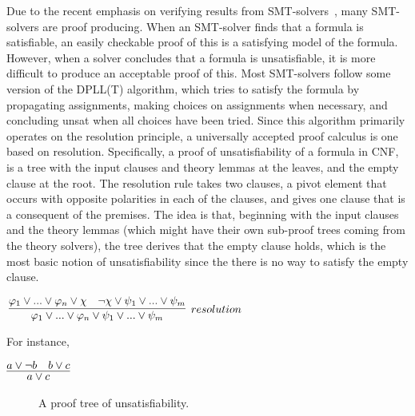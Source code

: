 \documentclass{article}
\begin{document}
	Due to the recent emphasis on verifying results from SMT-solvers~\cite{10.1145/1670412.1670413,
	mansur2020detecting, 10.1007/978-3-642-38916-0_3},
	many SMT-solvers are proof producing. When an SMT-solver finds 
	that a formula is satisfiable, an easily checkable proof of this is 
	a satisfying model of the formula. However, when a solver 
	concludes that a formula is unsatisfiable, it is more difficult 
	to produce an acceptable proof of this. Most SMT-solvers 
	follow some version of the DPLL(T) algorithm, which tries
	to satisfy the formula by propagating assignments, making 
	choices on assignments when necessary, and concluding unsat
	when all choices have been tried. Since this algorithm 
	primarily operates on the resolution principle, 
	a universally accepted proof calculus is one based 
	on resolution. Specifically, a proof of unsatisfiability 
	of a formula in CNF, is a tree with the input 
	clauses and theory lemmas at the leaves, and the empty 
	clause at the root. The resolution rule 
	takes two clauses, a pivot element that occurs 
	with opposite polarities 
	in each of the clauses, and gives one clause that is 
	a consequent of the premises. The idea is that, beginning 
	with the input clauses and the theory lemmas (which might 
	have their own sub-proof trees coming from the theory solvers), 
	the tree derives that the empty clause holds, which is the 
	most basic notion of unsatisfiability since the there 
	is no way to satisfy the empty clause.
	
	\begin{center}
		$\infer[resolution]{\varphi_1 \lor ... \lor \varphi_n \lor 
			\psi_1 \lor ... \lor \psi_m}
		{\varphi_1 \lor ... \lor \varphi_n \lor \chi & \neg \chi 
			\lor \psi_1 \lor ... \lor \psi_m}$ 
	\end{center}
	For instance,
	\begin{center}
		$\infer{a \lor c}{a \lor \neg b & b \lor c}$
	\end{center}
	
	\begin{figure}[t]
		\caption{A proof tree of unsatisfiability.}
		\label{fig:tree}
	\end{figure}
\end{document}
